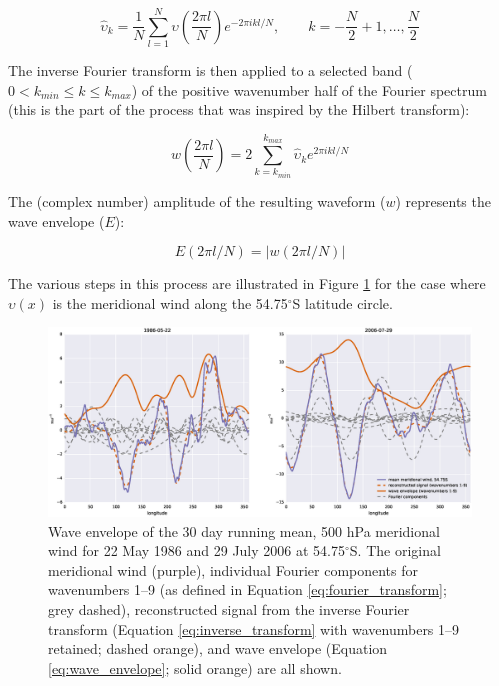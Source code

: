 \begin{equation}\label{eq:fourier_transform}
\hat{\upsilon}_k = \frac{1}{N}\sum_{l=1}^N \upsilon \left( \frac{2 \pi l}{N} \right) e^{-2 \pi ikl/N},\qquad k = -\frac{N}{2} + 1, \dotsc, \frac{N}{2}
\end{equation}

\noindent The inverse Fourier transform is then applied to a selected band ($0 < k_{min} \leq k \leq k_{max}$) of the positive wavenumber half of the Fourier spectrum (this is the part of the process that was inspired by the Hilbert transform):

\begin{equation}\label{eq:inverse_transform}
w \left( \frac{2 \pi l}{N} \right) = 2 \sum_{k=k_{min}}^{k_{max}} \hat{\upsilon}_k e^{2\pi ikl/N}
\end{equation}

\noindent The (complex number) amplitude of the resulting waveform ($w$) represents the wave envelope ($E$):

\begin{equation}\label{eq:wave_envelope}
E(2 \pi l / N) = | w(2 \pi l / N) |
\end{equation}

\noindent The various steps in this process are illustrated in Figure \ref{fig:example_hilbert} for the case where $\upsilon(x)$ is the meridional wind along the 54.75$^{\circ}$S latitude circle. 

\begin{figure}
\begin{center}
\includegraphics[width=1\columnwidth]{figures/zonalwaves/hilbert_zw_w19_va_ERAInterim_500hPa_030day-runmean_native-55S_1986-05-22_2006-07-29.eps}
\caption[Wave envelope of the 30 day running mean, 500 hPa meridional wind for 22 May 1986 and 29 July 2006 at 54.75$^{\circ}$S]{\label{fig:example_hilbert}
Wave envelope of the 30 day running mean, 500 hPa meridional wind for 22 May 1986 and 29 July 2006 at 54.75$^{\circ}$S. The original meridional wind (purple), individual Fourier components for wavenumbers 1--9 (as defined in Equation \ref{eq:fourier_transform}; grey dashed), reconstructed signal from the inverse Fourier transform (Equation \ref{eq:inverse_transform} with wavenumbers 1--9 retained; dashed orange), and wave envelope (Equation \ref{eq:wave_envelope}; solid orange) are all shown. %
}
\end{center}
\end{figure}


